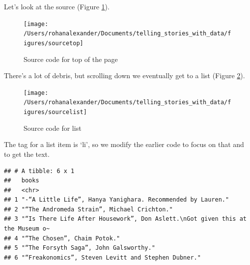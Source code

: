 \documentclass[
]{book}
\newenvironment{Shaded}{\begin{snugshade}}{\end{snugshade}}
\newcommand{\CommentTok}[1]{\textcolor[rgb]{0.56,0.35,0.01}{\textit{#1}}}
\newcommand{\DataTypeTok}[1]{\textcolor[rgb]{0.13,0.29,0.53}{#1}}
\newcommand{\KeywordTok}[1]{\textcolor[rgb]{0.13,0.29,0.53}{\textbf{#1}}}
\newcommand{\NormalTok}[1]{#1}
\newcommand{\OperatorTok}[1]{\textcolor[rgb]{0.81,0.36,0.00}{\textbf{#1}}}
\newcommand{\StringTok}[1]{\textcolor[rgb]{0.31,0.60,0.02}{#1}}
\begin{document}
Let's look at the source (Figure \ref{fig:rohanssourceone}).

\begin{figure}
\texttt{[image: /Users/rohanalexander/Documents/telling\_stories\_with\_data/figures/sourcetop]} \caption{Source code for top of the page}\label{fig:rohanssourceone}
\end{figure}

There's a lot of debris, but scrolling down we eventually get to a list (Figure \ref{fig:rohanssourcetwo}).

\begin{figure}
\texttt{[image: /Users/rohanalexander/Documents/telling\_stories\_with\_data/figures/sourcelist]} \caption{Source code for list}\label{fig:rohanssourcetwo}
\end{figure}

The tag for a list item is `li', so we modify the earlier code to focus on that and to get the text.

\begin{Shaded}
\end{Shaded}

\begin{verbatim}
## # A tibble: 6 x 1
##   books                                                                         
##   <chr>                                                                         
## 1 "-“A Little Life”, Hanya Yanighara. Recommended by Lauren."                   
## 2 "“The Andromeda Strain”, Michael Crichton."                                   
## 3 "“Is There Life After Housework”, Don Aslett.\nGot given this at the Museum o~
## 4 "“The Chosen”, Chaim Potok."                                                  
## 5 "“The Forsyth Saga”, John Galsworthy."                                        
## 6 "“Freakonomics”, Steven Levitt and Stephen Dubner."
\end{verbatim}
\end{document}
